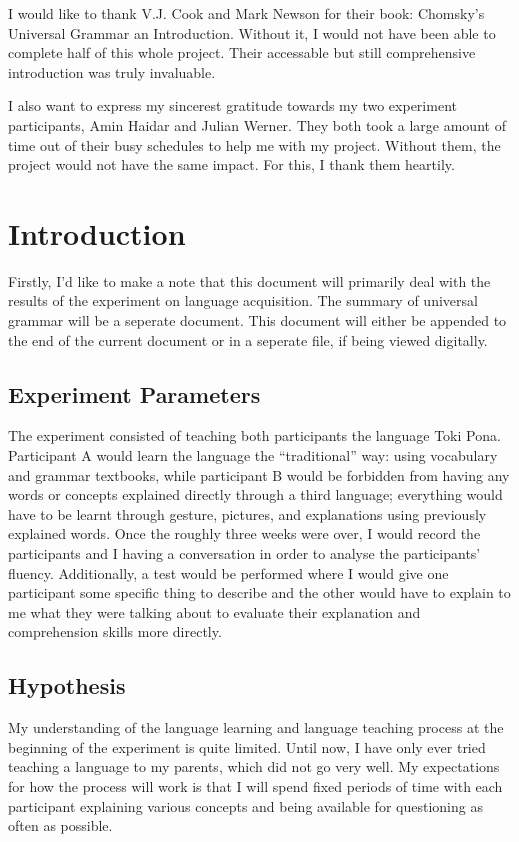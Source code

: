\documentclass[a4paper,10pt]{article}
\begin{document}
I would like to thank V.J. Cook and Mark Newson for their book: Chomsky's
Universal Grammar an Introduction. Without it, I would not have been able to complete half of this
whole project. Their accessable but still comprehensive introduction was truly invaluable.

I also want to express my sincerest gratitude towards my two experiment participants, Amin Haidar
and Julian Werner. They both took a large amount of time out of their busy schedules to help me with
my project. Without them, the project would not have the same impact. For this, I thank them heartily.


\section{Introduction}
Firstly, I'd like to make a note that this document will primarily deal with the results of the
experiment on language acquisition. The summary of universal grammar will be a seperate document.
This document will either be appended to the end of the current document or in a seperate file, if
being viewed digitally.

\subsection{Experiment Parameters}
The experiment consisted of teaching both participants the language Toki Pona. Participant A would
learn the language the ``traditional'' way: using vocabulary and grammar textbooks, while participant
B would be forbidden from having any words or concepts explained directly through a third language;
everything would have to be learnt through gesture, pictures, and explanations using previously
explained words. Once the roughly three weeks were over, I would record the participants and I having
a conversation in order to analyse the participants' fluency. Additionally, a test would be performed
where I would give one participant some specific thing to describe and the other would have to explain
to me what they were talking about to evaluate their explanation and comprehension skills more directly.


\subsection{Hypothesis}
My understanding of the language learning and language teaching process at the beginning of the
experiment is quite limited. Until now, I have only ever tried teaching a language to my
parents, which did not go very well. My expectations for how the process will work is that
I will spend fixed periods of time with each participant explaining various concepts and being
available for questioning as often as possible.
\end{document}

